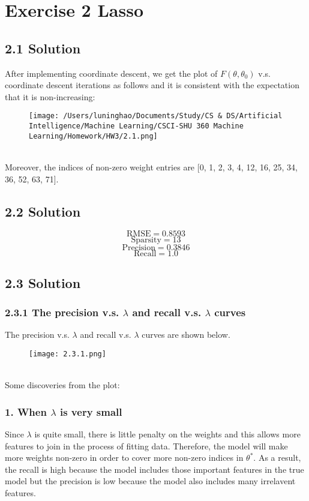 \documentclass{article}
\begin{document}
\section*{Exercise 2 Lasso}
\subsection*{2.1 Solution}
After implementing coordinate descent, we get the plot of $F(\theta, \theta_0)$ v.s. coordinate descent iterations as follows and it is consistent with the expectation that it is non-increasing:
\begin{figure}[h]
    \centering
    \texttt{[image: /Users/luninghao/Documents/Study/CS \& DS/Artificial Intelligence/Machine Learning/CSCI-SHU 360 Machine Learning/Homework/HW3/2.1.png]}
\end{figure} \\
Moreover, the indices of non-zero weight entries are [0, 1, 2, 3, 4, 12, 16, 25, 34, 36, 52, 63, 71].
\subsection*{2.2 Solution}
\[
\text{RMSE} = 0.8593
\]
\[
\text{Sparsity} = 13
\]
\[
\text{Precision} = 0.3846
\]
\[
\text{Recall} = 1.0
\]

\newpage
\subsection*{2.3 Solution}
\subsubsection*{2.3.1 The precision v.s. $\lambda$ and recall v.s. $\lambda$ curves}
The precision v.s. $\lambda$ and recall v.s. $\lambda$ curves are shown below.
\begin{figure}[h]
    \centering
    \texttt{[image: 2.3.1.png]}
\end{figure}\\
Some discoveries from the plot: 
\subsubsection*{1. When $\lambda$ is very small} Since $\lambda$ is quite small, there is little penalty on the weights and this allows more features to join in the process of fitting data. 
Therefore, the model will make more weights non-zero in order to cover more non-zero indices in $\theta^*$.
As a result, the recall is high because the model includes those important features in the true model but the precision is low because the model also includes many irrelavent features.
\end{document}
